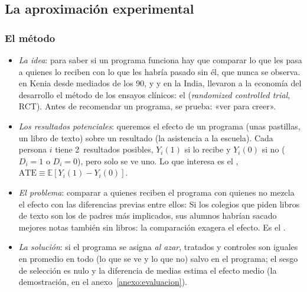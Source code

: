 \documentclass[11pt]{article}
\begin{document}
\subsection{La aproximación experimental}\label{sec:experimental}

\subsubsection{El método}\label{sec:metodo}


\begin{itemize}
\item \emph{La idea}: para saber si un programa funciona hay que comparar lo que les pasa a quienes lo reciben con lo que les habría pasado sin él, que nunca se observa.  en Kenia desde mediados de los 90, y  y  en la India, llevaron a la economía del desarrollo el método de los ensayos clínicos: el  (\emph{randomized controlled trial}, RCT). Antes de recomendar un programa, se prueba: «ver para creer».
\item \emph{Los resultados potenciales}\nocite{Rubin1974}: queremos el efecto de un programa (unas pastillas, un libro de texto) sobre un resultado (la asistencia a la escuela). Cada persona $i$ tiene 2~resultados posibles, $Y_i(1)$ si lo recibe y $Y_i(0)$ si no ($D_i=1$ o $D_i=0$), pero solo se ve uno. Lo que interesa es el , $\mathrm{ATE}\equiv\mathbb{E}[Y_i(1)-Y_i(0)]$.
\item \emph{El problema}: comparar a quienes reciben el programa con quienes no mezcla el efecto con las diferencias previas entre ellos:
  Si los colegios que piden libros de texto son los de padres más implicados, sus alumnos habrían sacado mejores notas también sin libros: la comparación exagera el efecto. Es el .
\item \emph{La solución}: si el programa se asigna \emph{al azar}, tratados y controles son iguales en promedio en todo (lo que se ve y lo que no) salvo en el programa; el sesgo de selección es nulo y la diferencia de medias estima el efecto medio\nocite{AngristPischke2009} (la demostración, en el anexo~\ref{anexo:evaluacion}).

\end{itemize}
\end{document}
